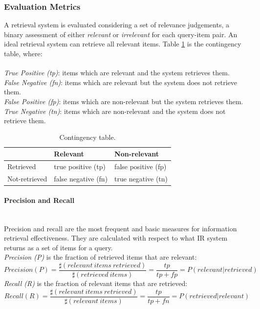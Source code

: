 \subsubsection{Evaluation Metrics}\label{s:trainalg-evalmetrics}

A retrieval system is evaluated considering a set of relevance judgements, a binary assessment of either \textit{relevant} or \textit{irrelevant} for each query-item pair. An ideal retrieval system can retrieve all relevant items. Table \ref{t:contingency} is the contingency table, where:\\\\
\textit{True Positive (tp)}: items which are relevant and the system retrieves them.\\
\textit{False Negative (fn)}: items which are relevant but the system does not retrieve them. \\
\textit{False Positive (fp)}: items which are non-relevant but the system retrieves them.\\
\textit{True Negative (tn)}: items which are non-relevant and the system does not retrieve them. 
\begin{table}[htpb]
	\centering
	\begin{tabular}{ | l | l | l | }
		\hline
		& Relevant & Non-relevant  \\ \hline
		Retrieved & true positive (tp) & false positive (fp) \\ \hline
		Not-retrieved & false negative (fn) & true negative (tn) \\ \hline
		
	\end{tabular}
	\caption{Contingency table.}
	\label{t:contingency}
\end{table}
\FloatBarrier 
\paragraph{Precision and Recall}
\ \\
Precision and recall are the most frequent and basic measures for information retrieval effectiveness. They are calculated with respect to what IR system returns as a set of items for a query.\\
\textit{Precision (P)} is the fraction of retrieved items that are relevant:
\[
Precision (P)=\frac{\sharp(relevant \: items \: retrieved)}{\sharp(retrieved \: items)}=\frac{tp}{tp+fp}=P(relevant|retrieved)
\]
\textit{Recall (R)} is the fraction of relevant items that are retrieved:
\[
Recall (R)=\frac{\sharp(relevant \: items \: retrieved)}{\sharp(relevant \: items)}=\frac{tp}{tp+fn}=P(retrieved|relevant)
\]

